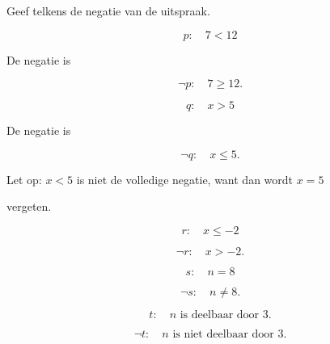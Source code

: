 \documentclass{ximera}
\begin{document}
\begin{oefening}{\oefB \ESS}

Geef telkens de negatie van de uitspraak.

\begin{question}

\[
p:\quad 7<12
\]

\begin{oplossing}

De negatie is

\[
\neg p:\quad 7\geq12.
\]

\end{oplossing}

\end{question}



\begin{question}

\[
q:\quad x>5
\]

\begin{oplossing}

De negatie is

\[
\neg q:\quad x\leq5.
\]

Let op: $x<5$ is niet de volledige negatie, want dan wordt $x=5$

vergeten.

\end{oplossing}

\end{question}



\begin{question}

\[
r:\quad x\leq-2
\]

\begin{oplossing}

\[
\neg r:\quad x>-2.
\]

\end{oplossing}

\end{question}



\begin{question}

\[
s:\quad n=8
\]

\begin{oplossing}

\[
\neg s:\quad n\neq8.
\]

\end{oplossing}

\end{question}



\begin{question}

\[
t:\quad n\text{ is deelbaar door }3.
\]

\begin{oplossing}

\[
\neg t:\quad n\text{ is niet deelbaar door }3.
\]

\end{oplossing}

\end{question}

\end{oefening}
\end{document}
